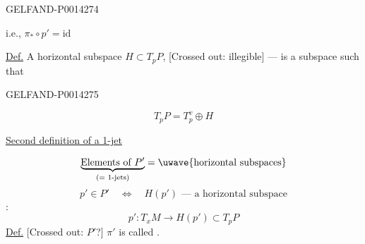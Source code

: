 \begin{GelfandAdjacentEvidence}{GELFAND-P001427}{4}

i.e., \(\pi_*\circ p'=\mathrm{id}\)

\uline{Def.} A horizontal subspace \(H\subset T_pP\),
[Crossed out: illegible] — is a subspace such that
\end{GelfandAdjacentEvidence}
\begin{GelfandAdjacentEvidence}{GELFAND-P001427}{5}

\[
T_pP=T_p^v\oplus H
\]

\uline{Second definition of a 1-jet}

\[
\underbrace{\text{Elements of }P'}_{\text{(\(=\) 1-jets)}}
=\text{\uwave{horizontal subspaces}}
\]
\[
p'\in P'\quad\Longleftrightarrow\quad H(p')\text{ — a horizontal subspace}
\]
:
\[
p'\colon T_xM\to H(p')\subset T_pP
\]
\uline{Def.} [Crossed out: \(P'\)?]
\(\pi'\) is called .
\end{GelfandAdjacentEvidence}



